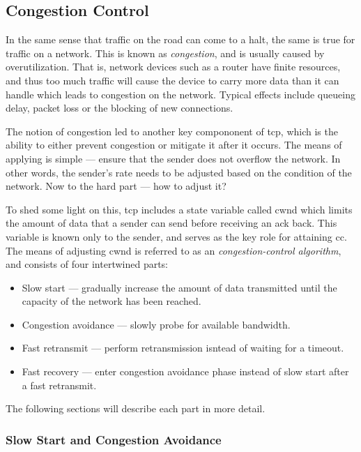 \subsection{Congestion Control} \label{sec:cc}

In the same sense that traffic on the road can come to a halt, the same is true for traffic on a network. This is known as \textit{congestion}, and is usually caused by overutilization. That is, network devices such as a router have finite resources, and thus too much traffic will cause the device to carry more data than it can handle which leads to congestion on the network. Typical effects include queueing delay, packet loss or the blocking of new connections.

The notion of congestion led to another key compononent of \gls{tcp}, which is the ability to either prevent congestion or mitigate it after it occurs. The means of applying  is simple --- ensure that the sender does not overflow the network. In other words, the sender's rate needs to be adjusted based on the condition of the network. Now to the hard part --- how to adjust it?

To shed some light on this, \gls{tcp} includes a state variable called \gls{cwnd} which limits the amount of data that a sender can send before receiving an \gls{ack} back. This variable is known only to the sender, and serves as the key role for attaining \gls{cc}. The means of adjusting \gls{cwnd} is referred to as an \textit{congestion-control algorithm}, and consists of four intertwined parts:

\begin{itemize}
    \item Slow start --- gradually increase the amount of data transmitted until the capacity of the network has been reached.
    \item Congestion avoidance --- slowly probe for available bandwidth.
    \item Fast retransmit --- perform retransmission isntead of waiting for a timeout.
    \item Fast recovery --- enter congestion avoidance phase instead of slow start after a fast retransmit.
\end{itemize}

The following sections will describe each part in more detail.




\subsubsection{Slow Start and Congestion Avoidance}

